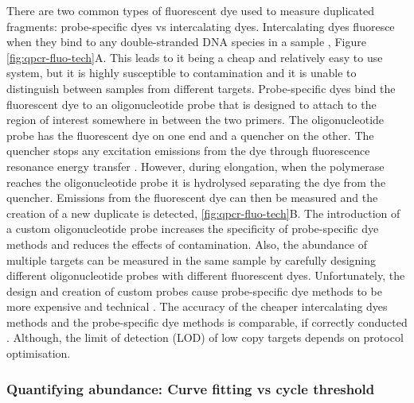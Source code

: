 \documentclass[../main.tex]{subfiles}
\begin{document}

There are two common types of fluorescent dye used to measure duplicated fragments: probe-specific dyes vs intercalating dyes.
Intercalating dyes fluoresce when they bind to any double-stranded DNA species in a sample \parencite{Ihmels2005}, Figure \ref{fig:qpcr-fluo-tech}A.
This leads to it being a cheap and relatively easy to use system, but it is highly susceptible to contamination and it is unable to distinguish between samples from different targets. 
Probe-specific dyes bind the fluorescent dye to an oligonucleotide probe that is designed to attach to the region of interest somewhere in between the two primers. 
The oligonucleotide probe has the fluorescent dye on one end and a quencher on the other.
The quencher stops any excitation emissions from the dye through fluorescence resonance energy transfer \parencite{Juskowiak2010}. 
However, during elongation, when the polymerase reaches the oligonucleotide probe it is hydrolysed separating the dye from the quencher.
Emissions from the fluorescent dye can then be measured and the creation of a new duplicate is detected, \ref{fig:qpcr-fluo-tech}B. 
The introduction of a custom oligonucleotide probe increases the specificity of probe-specific dye methods and reduces the effects of contamination. 
Also, the abundance of multiple targets can be measured in the same sample by carefully designing different oligonucleotide probes with different fluorescent dyes.
Unfortunately, the design and creation of custom probes cause probe-specific dye methods to be more expensive and technical \parencite{Adams2020}. 
The accuracy of the cheaper intercalating dyes methods and the probe-specific dye methods is comparable, if correctly conducted \parencite{Tajadini2014}.
Although, the limit of detection (LOD) of low copy targets depends on protocol optimisation. 

\subsubsection{Quantifying abundance: Curve fitting vs cycle threshold}
\end{document}
